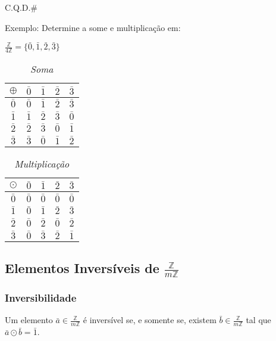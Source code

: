 C.Q.D.\#

Exemplo: Determine a some e multiplicação em:

$\displaystyle\frac{\mathbb{Z}}{4\mathbb{Z}}=\{\bar{0},\bar{1},\bar{2},\bar{3}\}$
\begin{table}[h]
   \centering
   \setlength{\arrayrulewidth}{0,5\arrayrulewidth}
   \caption{\it Soma}
   \begin{tabular}{|c|c|c|c|c|}
      \hline
      $\oplus$ & $\bar{0}$ & $\bar{1}$ & $\bar{2}$ & $\bar{3}$ \\
      \hline
      $\bar{0}$ & $\bar{0}$ & $\bar{1}$ & $\bar{2}$ & $\bar{3}$ \\
      \hline
      $\bar{1}$ & $\bar{1}$ & $\bar{2}$ & $\bar{3}$ & $\bar{0}$ \\
      \hline
      $\bar{2}$ & $\bar{2}$ & $\bar{3}$ & $\bar{0}$ & $\bar{1}$ \\
      \hline
      $\bar{3}$ & $\bar{3}$ & $\bar{0}$ & $\bar{1}$ & $\bar{2}$ \\
      \hline
   \end{tabular}
\end{table}

\begin{table}[h]
   \centering
   \setlength{\arrayrulewidth}{0,5\arrayrulewidth}
   \caption{\it Multiplicação}
   \begin{tabular}{|c|c|c|c|c|}
      \hline
      $\odot$ & $\bar{0}$ & $\bar{1}$ & $\bar{2}$ & $\bar{3}$ \\
      \hline
      $\bar{0}$ & $\bar{0}$ & $\bar{0}$ & $\bar{0}$ & $\bar{0}$ \\
      \hline
      $\bar{1}$ & $\bar{0}$ & $\bar{1}$ & $\bar{2}$ & $\bar{3}$ \\
      \hline
      $\bar{2}$ & $\bar{0}$ & $\bar{2}$ & $\bar{0}$ & $\bar{2}$ \\
      \hline
      $\bar{3}$ & $\bar{0}$ & $\bar{3}$ & $\bar{2}$ & $\bar{1}$ \\
      \hline
   \end{tabular}
\end{table}


\subsection{Elementos Inversíveis de $\displaystyle\frac{\mathbb{Z}}{m\mathbb{Z}}$}

\subsubsection{Inversibilidade}
\begin{definicao}[Inversibilidade] Um elemento $\bar{a}\in\displaystyle\frac{\mathbb{Z}}{m\mathbb{Z}}$ é inversível se, e somente se, existem $\bar{b}\in\displaystyle\frac{\mathbb{Z}}{m\mathbb{Z}}$ tal que $\bar{a}\odot\bar{b}=\bar{1}$.\end{definicao}

